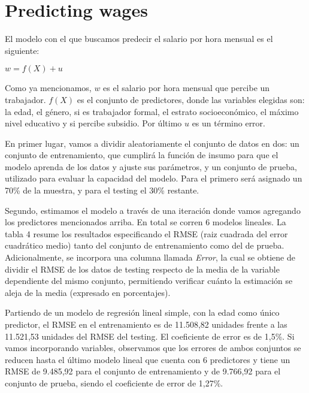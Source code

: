 \documentclass[11pt,oneside]{article}
\begin{document}
	\newpage
	
	
	
	\section{Predicting wages}
	
	El modelo con el que buscamos predecir el salario por hora mensual es el siguiente:
	
	\begin{center}
		$w = f(X) + u$
	\end{center}
	
	Como ya mencionamos, $w$ es el salario por hora mensual que percibe un trabajador. $f(X)$ es el conjunto de predictores, donde las variables elegidas son: la edad, el género, si es trabajador formal, el estrato socioeconómico, el máximo nivel educativo y si percibe subsidio. Por último $u$ es un término error.
	
	En primer lugar, vamos a dividir aleatoriamente el conjunto de datos en dos: un conjunto de entrenamiento, que cumplirá la función de insumo para que el modelo aprenda de los datos y ajuste sus parámetros, y un conjunto de prueba, utilizado para evaluar la capacidad del modelo. Para el primero será asignado un 70\% de la muestra, y para el testing el 30\% restante.
	
	Segundo, estimamos el modelo a través de una iteración donde vamos agregando los predictores mencionados arriba. En total se corren 6 modelos lineales. La tabla 4 resume los resultados especificando el RMSE (raiz cuadrada del error cuadrático medio) tanto del conjunto de entrenamiento como del de prueba. Adicionalmente, se incorpora una columna llamada \textit{Error}, la cual se obtiene de dividir el RMSE de los datos de testing respecto de la media de la variable dependiente del mismo conjunto, permitiendo verificar cuánto la estimación se aleja de la media (expresado en porcentajes). 
	
	
	Partiendo de un modelo de regresión lineal simple, con la edad como único predictor, el RMSE en el entrenamiento es de 11.508,82 unidades frente a las 11.521,53 unidades del RMSE del testing. El coeficiente de error es de 1,5\%. Si vamos incorporando variables, observamos que los errores de ambos conjuntos se reducen hasta el último modelo lineal que cuenta con 6 predictores y tiene un RMSE de 9.485,92 para el conjunto de entrenamiento y de 9.766,92 para el conjunto de prueba, siendo el coeficiente de error de 1,27\%. 
	
\end{document}
